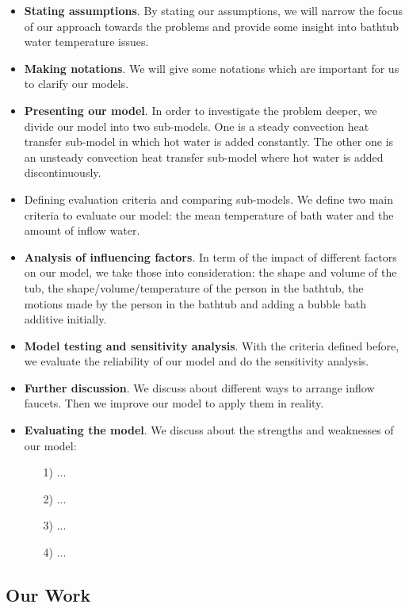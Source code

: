 \begin{itemize}
\item {\bf Stating assumptions}. By stating our assumptions, we will narrow the focus of our approach towards the problems and provide some insight into bathtub water temperature issues.

\item {\bf Making notations}. We will give some notations which are important for us to clarify our models.

\item {\bf Presenting our model}. In order to investigate the problem deeper, we divide our model into two sub-models. One is a steady convection heat transfer sub-model in which hot water is added constantly. The other one is an unsteady convection heat transfer sub-model where hot water is added discontinuously.

\item {Defining evaluation criteria and comparing sub-models}. We define two main criteria to evaluate our model: the mean temperature of bath water and the amount of inflow water.

\item {\bf Analysis of influencing factors}. In term of the impact of different factors on our model, we take those into consideration: the shape and volume of the tub, the shape/volume/temperature of the person in the bathtub, the motions made by the person in the bathtub and adding a bubble bath additive initially.

\item {\bf Model testing and sensitivity analysis}. With the criteria defined before, we evaluate the reliability of our model and do the sensitivity analysis.

\item {\bf Further discussion}. We discuss about different ways to arrange inflow faucets. Then we improve our model to apply them in reality.

\item {\bf Evaluating the model}. We discuss about the strengths and weaknesses of our model:

\begin{itemize}
\item[1)] ... 
\item[2)] ...
\item[3)] ...
\item[4)] ...
\end{itemize}

\end{itemize}

\subsection{Our Work}